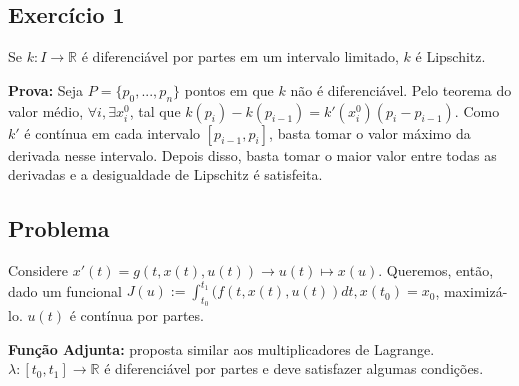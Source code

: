 \subsection*{Exercício 1}
Se $k: I \to \mathbb{R}$ é diferenciável por partes em um intervalo limitado, $k$ é Lipschitz. 

\textbf{Prova:} Seja $P = \{p_0, ..., p_n\}$ pontos em que $k$ não é diferenciável. Pelo teorema do valor médio, $\forall i, \exists x_i^0 $, tal que $k(p_i) - k(p_{i-1}) = k'(x_i^0)(p_i - p_{i-1})$. Como $k'$ é contínua em cada intervalo $[p_{i-1},p_i]$, basta tomar o valor máximo da derivada nesse intervalo. Depois disso, basta tomar o maior valor entre todas as derivadas e a desigualdade de Lipschitz é satisfeita. 

\subsection{Problema} 

Considere $x'(t) = g(t,x(t),u(t)) \to u(t) \mapsto x(u)$. Queremos, então, dado um funcional $ J(u) := \int_{t_0}^{t_1} (f(t,x(t),u(t))dt, x(t_0) = x_0$, maximizá-lo.  $u(t)$ é contínua por partes. 

\textbf{Função Adjunta:} proposta similar aos multiplicadores de Lagrange. $\lambda : [t_0,t_1] \to \mathbb{R}$ é diferenciável por partes e deve satisfazer algumas condições. 

